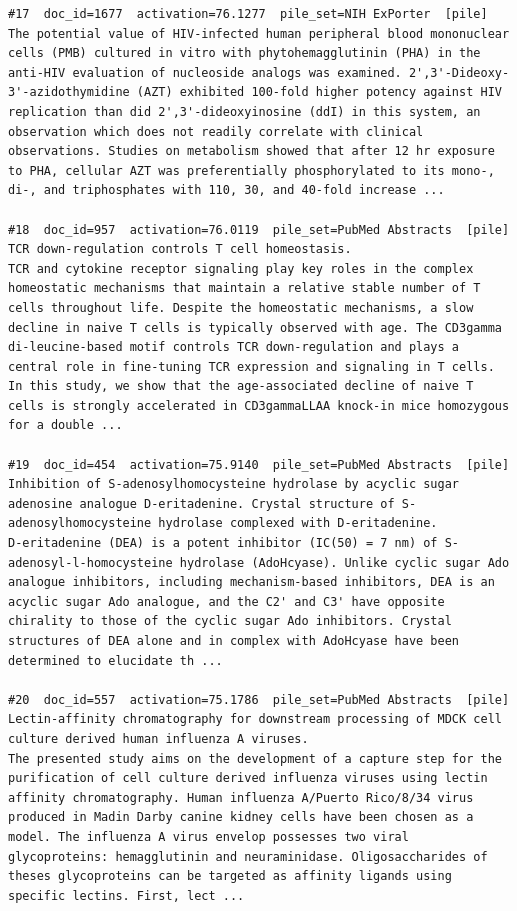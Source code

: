 \begin{verbatim}
#17  doc_id=1677  activation=76.1277  pile_set=NIH ExPorter  [pile]
The potential value of HIV-infected human peripheral blood mononuclear cells (PMB) cultured in vitro with phytohemagglutinin (PHA) in the anti-HIV evaluation of nucleoside analogs was examined. 2',3'-Dideoxy-3'-azidothymidine (AZT) exhibited 100-fold higher potency against HIV replication than did 2',3'-dideoxyinosine (ddI) in this system, an observation which does not readily correlate with clinical observations. Studies on metabolism showed that after 12 hr exposure to PHA, cellular AZT was preferentially phosphorylated to its mono-, di-, and triphosphates with 110, 30, and 40-fold increase ...

#18  doc_id=957  activation=76.0119  pile_set=PubMed Abstracts  [pile]
TCR down-regulation controls T cell homeostasis.
TCR and cytokine receptor signaling play key roles in the complex homeostatic mechanisms that maintain a relative stable number of T cells throughout life. Despite the homeostatic mechanisms, a slow decline in naive T cells is typically observed with age. The CD3gamma di-leucine-based motif controls TCR down-regulation and plays a central role in fine-tuning TCR expression and signaling in T cells. In this study, we show that the age-associated decline of naive T cells is strongly accelerated in CD3gammaLLAA knock-in mice homozygous for a double ...

#19  doc_id=454  activation=75.9140  pile_set=PubMed Abstracts  [pile]
Inhibition of S-adenosylhomocysteine hydrolase by acyclic sugar adenosine analogue D-eritadenine. Crystal structure of S-adenosylhomocysteine hydrolase complexed with D-eritadenine.
D-eritadenine (DEA) is a potent inhibitor (IC(50) = 7 nm) of S-adenosyl-l-homocysteine hydrolase (AdoHcyase). Unlike cyclic sugar Ado analogue inhibitors, including mechanism-based inhibitors, DEA is an acyclic sugar Ado analogue, and the C2' and C3' have opposite chirality to those of the cyclic sugar Ado inhibitors. Crystal structures of DEA alone and in complex with AdoHcyase have been determined to elucidate th ...

#20  doc_id=557  activation=75.1786  pile_set=PubMed Abstracts  [pile]
Lectin-affinity chromatography for downstream processing of MDCK cell culture derived human influenza A viruses.
The presented study aims on the development of a capture step for the purification of cell culture derived influenza viruses using lectin affinity chromatography. Human influenza A/Puerto Rico/8/34 virus produced in Madin Darby canine kidney cells have been chosen as a model. The influenza A virus envelop possesses two viral glycoproteins: hemagglutinin and neuraminidase. Oligosaccharides of theses glycoproteins can be targeted as affinity ligands using specific lectins. First, lect ...

\end{verbatim}

